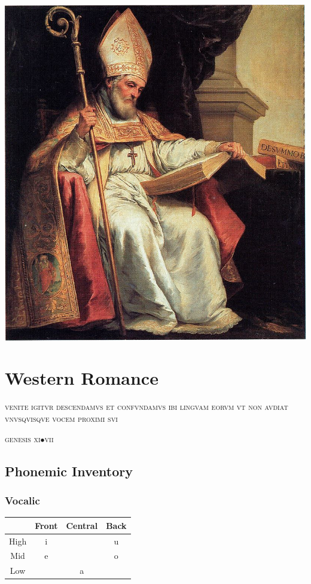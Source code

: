 \documentclass{report}[12pt]
\begin{document}
\pagebreak

\includegraphics[scale=5.0]{isidorus.jpeg}

\thispagestyle{empty}

\pagebreak

\chapter{Western Romance}

\epigraph{\textsc{venite igitvr descendamvs et confvndamvs ibi lingvam eorvm vt non avdiat vnvsqvisqve vocem proximi svi}}{\textsc{genesis} \textsc{xi}$\bullet$\textsc{vii}}

\section{Phonemic Inventory}

\subsection{Vocalic}

\begin{tcolorbox}[title=Western Romance Monophthongs, hbox]
  \begin{tabular}{|c|c|c|c|}
    \hline
    & Front & Central & Back \\
    \hline
    High & i & & u \\
    \hline
    Mid & e & & o \\
    \hline
    Low & & a & \\
    \hline
  \end{tabular}
\end{tcolorbox}
\end{document}
